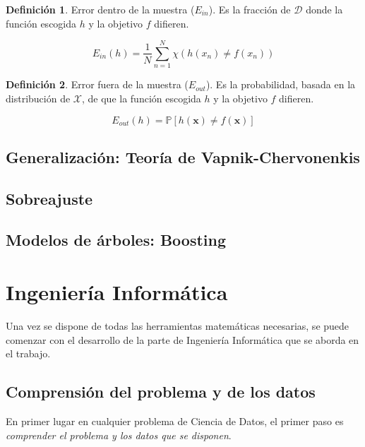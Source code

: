 \documentclass[a4paper,11pt]{book}\usepackage[]{graphicx}\usepackage[]{color}
\theoremstyle{plain}
\theoremstyle{definition}
\newtheorem{definicion}{Definición}[chapter]
\begin{document}
\begin{definicion}
  Error dentro de la muestra ($E_{in}$). Es la fracción de $\mathcal{D}$ donde la función escogida $h$ y la objetivo $f$ difieren.

  \[
    E_{in}(h) = \frac{1}{N} \sum\limits_{n=1}^N \chi(h(x_n) \neq f(x_n))
  \]
\end{definicion}

\begin{definicion}
  Error fuera de la muestra ($E_{out}$). Es la probabilidad, basada en la distribución
  de $\mathcal{X}$, de que la función escogida $h$ y la objetivo $f$ difieren.

  \[
    E_{out}(h) = \mathbb{P}[h(\textbf{x}) \neq f(\textbf{x})]
  \]
\end{definicion}


\subsection{Generalización: Teoría de Vapnik-Chervonenkis}

\subsection{Sobreajuste}

\subsection{Modelos de árboles: Boosting}

\newpage
\section{Ingeniería Informática}
\label{sec:informatica}
Una vez se dispone de todas las herramientas matemáticas necesarias,
se puede comenzar con el desarrollo de la parte de Ingeniería Informática que
se aborda en el trabajo.

\subsection{Comprensión del problema y de los datos}
\label{subsec:comprension}

En primer lugar en cualquier problema de Ciencia de Datos, el primer
paso es \emph{comprender el problema y los datos que se disponen}.
\end{document}
